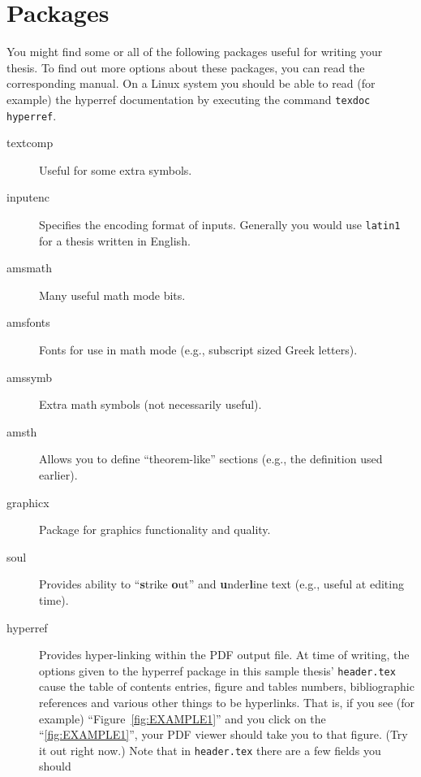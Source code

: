 \chapter{Packages}

You might find some or all of the following packages useful for
writing your thesis.  To find out more options about these packages,
you can read the corresponding manual.  On a Linux system you should be
able to read (for example) the hyperref documentation by executing the
command \verb|texdoc hyperref|.


\begin{description}
    \item[textcomp] Useful for some extra symbols.
    \item[inputenc] Specifies the encoding format of inputs.
      Generally you would use \verb|latin1| for a thesis written in
      English.
    \item[amsmath] Many useful math mode bits. 
    \item[amsfonts] Fonts for use in math mode (e.g., subscript sized
    Greek letters). 
    \item[amssymb] Extra math symbols (not necessarily useful).
    \item[amsth] Allows you to define ``theorem-like'' sections
    (e.g., the definition used earlier).
    \item[graphicx] Package for graphics functionality and quality.
    \item[soul] Provides ability to ``\textbf{s}trike \textbf{o}ut''
      and \textbf{u}nder\textbf{l}ine text (e.g., useful at
    editing time).
    \item[hyperref] Provides hyper-linking within the PDF output file.
      At time of writing, the options given to the hyperref package in
      this sample thesis' \verb|header.tex| cause the table of
      contents entries, figure and tables numbers, bibliographic
      references and various other things to be hyperlinks.  That is,
      if you see (for example) ``Figure~\ref{fig:EXAMPLE1}'' and you
      click on the ``\ref{fig:EXAMPLE1}'', your PDF viewer should take
      you to that figure.  (Try it out right now.)
      Note that in \verb|header.tex| there are a few fields you should

\end{description}
